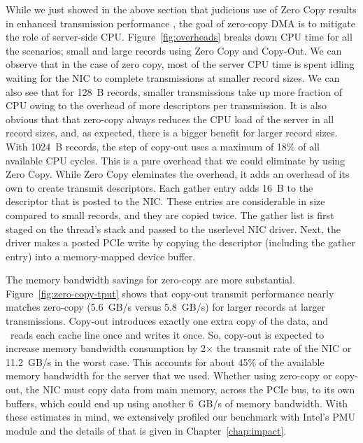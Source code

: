 
While we just showed in the above section that judicious use of Zero Copy results in  enhanced transmission performance
, the goal of zero-copy DMA is to mitigate the role of server-side CPU. Figure~\ref{fig:overheads} breaks down
CPU time for all the scenarios; small and large records using Zero Copy and Copy-Out. We can observe that in the case 
of zero copy, most of the server CPU time is spent idling waiting for the NIC 
to complete transmissions at smaller record sizes. We can also see that for 128~B records,
smaller transmissions take up more fraction of CPU owing to the overhead of more descriptors
per transmission. It is also obvious that that zero-copy always reduces 
the CPU load of the server in all record sizes, and, as expected, there is a bigger
benefit for larger record sizes. 
With 1024~B records, the \memcpy  step of copy-out uses a maximum of 18\% of all available
CPU cycles. This is a pure overhead that we could eliminate by using Zero Copy.
While Zero Copy eleminates the \memcpy overhead, it adds an overhead of its own to create  transmit descriptors.
Each gather entry adds 16~B to the descriptor that is posted to the NIC.
These entries are considerable in size compared to
small records, and they are copied twice. The gather list
is first staged on the thread's stack and passed to the userlevel NIC driver. Next,
the driver makes a posted PCIe write by copying the descriptor (including the
gather entry) into a memory-mapped device buffer.

The memory bandwidth savings for zero-copy are more substantial.
Figure~\ref{fig:zero-copy-tput} shows that copy-out transmit performance nearly
matches zero-copy (5.6~GB/s versus 5.8~GB/s) for larger records at larger transmissions. Copy-out introduces exactly one
extra copy of the data, and \memcpy~reads each cache line once and writes it
once. So, copy-out is expected to increase memory bandwidth consumption
by 2$\times$ the transmit rate of the NIC or 11.2~GB/s in the worst case.  This
accounts for about 45\% of the available memory bandwidth for the server that we used. Whether
using zero-copy or copy-out, the NIC must copy data from main memory, across the PCIe bus, to its own buffers, which
could end up using another 6~GB/s of memory bandwidth. With these estimates in mind, we extensively profiled
 our benchmark with Intel's PMU module and the details of that is given in Chapter~\ref{chap:impact}.



